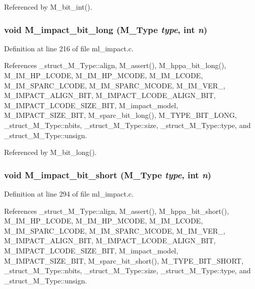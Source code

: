 Referenced by M\_\-bit\_\-int().
\subsubsection{\setlength{\rightskip}{0pt plus 5cm}void M\_\-impact\_\-bit\_\-long (\bf{M\_\-Type} {\em type}, int {\em n})}\label{ml__impact_8c_addedb5ab4da29436e92243f51462890}




Definition at line 216 of file ml\_\-impact.c.

References \_\-struct\_\-M\_\-Type::align, M\_\-assert(), M\_\-hppa\_\-bit\_\-long(), M\_\-IM\_\-HP\_\-LCODE, M\_\-IM\_\-HP\_\-MCODE, M\_\-IM\_\-LCODE, M\_\-IM\_\-SPARC\_\-LCODE, M\_\-IM\_\-SPARC\_\-MCODE, M\_\-IM\_\-VER\_, M\_\-IMPACT\_\-ALIGN\_\-BIT, M\_\-IMPACT\_\-LCODE\_\-ALIGN\_\-BIT, M\_\-IMPACT\_\-LCODE\_\-SIZE\_\-BIT, M\_\-impact\_\-model, M\_\-IMPACT\_\-SIZE\_\-BIT, M\_\-sparc\_\-bit\_\-long(), M\_\-TYPE\_\-BIT\_\-LONG, \_\-struct\_\-M\_\-Type::nbits, \_\-struct\_\-M\_\-Type::size, \_\-struct\_\-M\_\-Type::type, and \_\-struct\_\-M\_\-Type::unsign.

Referenced by M\_\-bit\_\-long().
\subsubsection{\setlength{\rightskip}{0pt plus 5cm}void M\_\-impact\_\-bit\_\-short (\bf{M\_\-Type} {\em type}, int {\em n})}\label{ml__impact_8c_14aa64b9319ab1623ba269cbc125127b}




Definition at line 294 of file ml\_\-impact.c.

References \_\-struct\_\-M\_\-Type::align, M\_\-assert(), M\_\-hppa\_\-bit\_\-short(), M\_\-IM\_\-HP\_\-LCODE, M\_\-IM\_\-HP\_\-MCODE, M\_\-IM\_\-LCODE, M\_\-IM\_\-SPARC\_\-LCODE, M\_\-IM\_\-SPARC\_\-MCODE, M\_\-IM\_\-VER\_, M\_\-IMPACT\_\-ALIGN\_\-BIT, M\_\-IMPACT\_\-LCODE\_\-ALIGN\_\-BIT, M\_\-IMPACT\_\-LCODE\_\-SIZE\_\-BIT, M\_\-impact\_\-model, M\_\-IMPACT\_\-SIZE\_\-BIT, M\_\-sparc\_\-bit\_\-short(), M\_\-TYPE\_\-BIT\_\-SHORT, \_\-struct\_\-M\_\-Type::nbits, \_\-struct\_\-M\_\-Type::size, \_\-struct\_\-M\_\-Type::type, and \_\-struct\_\-M\_\-Type::unsign.

